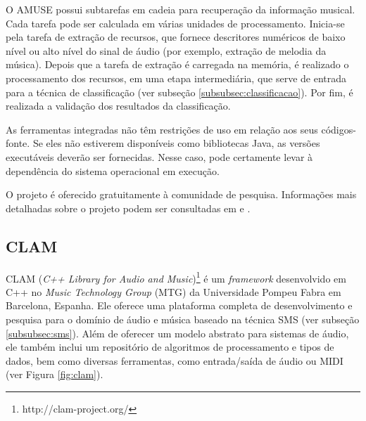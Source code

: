 O AMUSE possui subtarefas em cadeia para recuperação da informação musical. Cada tarefa pode ser calculada em várias unidades de processamento. Inicia-se pela tarefa de extração de recursos, que fornece descritores numéricos de baixo nível ou alto nível do sinal de áudio (por exemplo, extração de melodia da música). Depois que a tarefa de extração é carregada na memória, é realizado o processamento dos recursos, em uma etapa intermediária, que serve de entrada para a técnica de classificação (ver subseção \ref{subsubsec:classificacao}). Por fim, é realizada a validação dos resultados da classificação. 

As ferramentas integradas não têm restrições de uso em relação aos seus códigos-fonte. Se eles não estiverem disponíveis como bibliotecas Java, as versões executáveis deverão ser fornecidas. Nesse caso, pode certamente levar à dependência do sistema operacional em execução.

O projeto é oferecido gratuitamente à comunidade de pesquisa. Informações mais detalhadas sobre o projeto podem ser consultadas em \cite{vatolkin2010} e \cite{amuse}.

\subsection{CLAM} \label{subsec:clam}
CLAM (\textit{C++ Library for Audio and Music})\footnote{http://clam-project.org/} é um \textit{framework} desenvolvido em C++ no \textit{Music Technology Group} (MTG) da Universidade Pompeu Fabra em Barcelona, Espanha. Ele oferece uma plataforma completa de desenvolvimento e pesquisa para o domínio de áudio e música baseado na técnica SMS (ver subseção \ref{subsubsec:sms}). Além de oferecer um modelo abstrato para sistemas de áudio, ele também inclui um repositório de algoritmos de processamento e tipos de dados, bem como diversas ferramentas, como entrada/saída de áudio ou MIDI (ver Figura \ref{fig:clam}).

